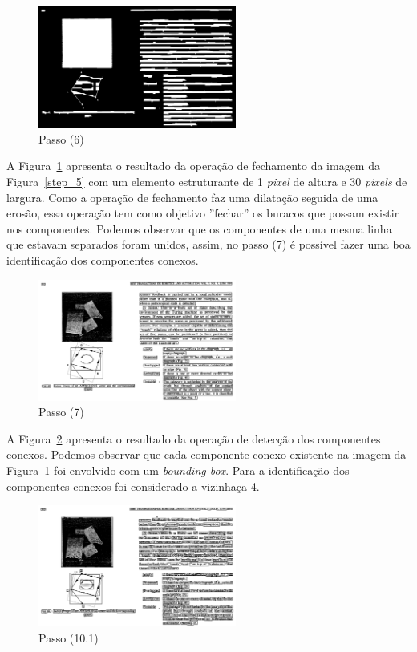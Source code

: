 \documentclass[twoside,twocolumn]{article}
\begin{document}
\begin{figure}[H]
\begin{center}
	\includegraphics[height=4cm]{figures/step_6.png}
\caption{Passo (6)} \label{step_6}
\end{center}
\end{figure}

A Figura~\ref{step_6} apresenta o resultado da operação de fechamento da imagem da Figura~\ref{step_5} com um elemento estruturante de 1 \textit{pixel} de altura e 30 \textit{pixels} de largura. Como a operação de fechamento faz uma dilatação seguida de uma erosão, essa operação tem como objetivo ''fechar'' os buracos que possam existir nos componentes. Podemos observar que os componentes de uma mesma linha que estavam separados foram unidos, assim, no passo (7) é possível fazer uma boa identificação dos componentes conexos.

\begin{figure}[H]
\begin{center}
	\includegraphics[height=4cm]{figures/step_7.png}
\caption{Passo (7)} \label{step_7}
\end{center}
\end{figure}

A Figura~\ref{step_7} apresenta o resultado da operação de detecção dos componentes conexos. Podemos observar que cada componente conexo existente na imagem da Figura~\ref{step_6} foi envolvido com um \textit{bounding box}. Para a identificação dos componentes conexos foi considerado a vizinhaça-4.

\begin{figure}[H]
\begin{center}
	\includegraphics[height=4cm]{figures/step_10_1.png}
\caption{Passo (10.1)} \label{step_10_1}
\end{center}
\end{figure}
\end{document}
